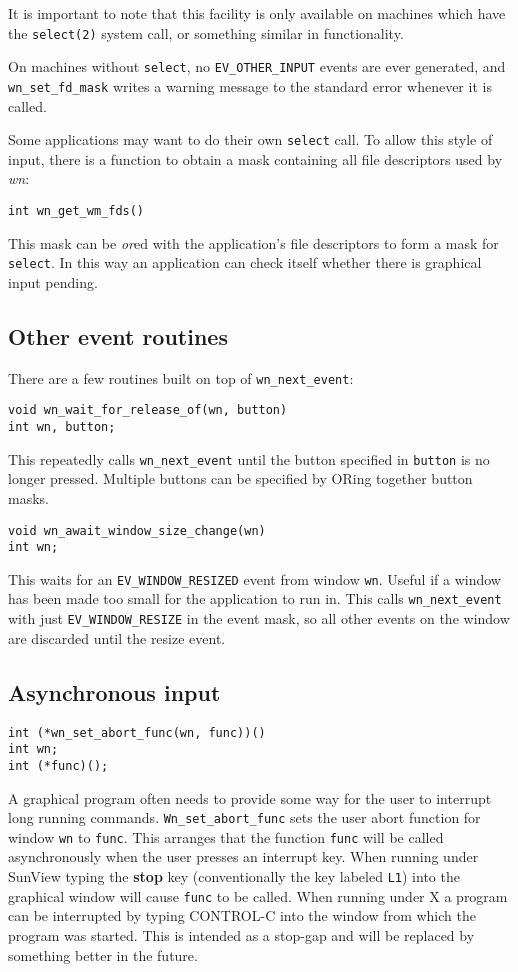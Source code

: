 It is important to note that this facility is only available on machines
which have the {\tt select(2)} system call, or something similar in
functionality.

On machines without {\tt select}, no {\tt EV\_OTHER\_INPUT} events are ever
generated, and {\tt wn\_set\_fd\_mask} writes a warning message to the
standard error whenever it is called.

Some applications may want to do their own {\tt select} call.
To allow this style of input, there is a function to obtain a mask
containing all file descriptors used by {\em wn}:
\begin{verbatim}
int wn_get_wm_fds()
\end{verbatim}
This mask can be {\em or}ed with the application's file descriptors to
form a mask for {\tt select}.
In this way an application can check itself whether there is
graphical input pending.
\subsection{Other event routines}
There are a few routines built on top of {\tt wn\_next\_event}:
\begin{verbatim}
void wn_wait_for_release_of(wn, button)
int wn, button;
\end{verbatim}
This repeatedly calls {\tt wn\_next\_event} until the button specified
in {\tt button} is no longer pressed.
Multiple buttons can be specified by ORing together button masks.
\begin{verbatim}
void wn_await_window_size_change(wn)
int wn;
\end{verbatim}
This waits for an {\tt EV\_WINDOW\_RESIZED} event from window {\tt wn}.
Useful if a window has been made too small for the application to run
in.
This calls {\tt wn\_next\_event} with just {\tt EV\_WINDOW\_RESIZE}
in the event mask, so all other events on the window are discarded until
the resize event.
\subsection{Asynchronous input}
\begin{verbatim}
int (*wn_set_abort_func(wn, func))()
int wn;
int (*func)();
\end{verbatim}
A graphical program often needs to provide some way for the user to
interrupt long running commands. {\tt Wn\_set\_abort\_func}
sets the user abort function for window {\tt wn} to {\tt func}.
This arranges that the function {\tt func} will be called asynchronously
when the user presses an interrupt key.
When running under SunView typing the {\bf stop} key (conventionally the
key labeled {\tt L1}) into the graphical window will
cause {\tt func} to be called. When running under X a program can be
interrupted by typing CONTROL-C into the window from which the program was
started. This is intended as a stop-gap and will be replaced by something
better in the future.


